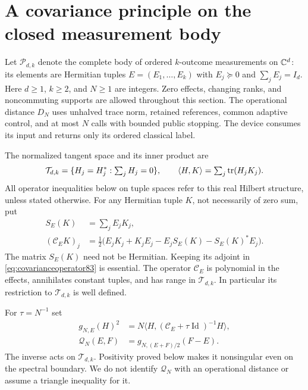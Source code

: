 \section{A covariance principle on the closed measurement body}
\label{sec:covariance83}

Let $\mathcal P_{d,k}$ denote the complete body of ordered $k$-outcome
measurements on $\mathbb C^d$: its elements are Hermitian tuples
$E=(E_1,\ldots,E_k)$ with $E_j\succeq0$ and $\sum_jE_j=I_d$.
Here $d\ge1$, $k\ge2$, and $N\ge1$ are integers.  Zero effects,
changing ranks, and noncommuting supports are allowed throughout
this section.  The operational distance $D_N$ uses unhalved trace
norm, retained references, common adaptive control, and at most $N$
calls with bounded public stopping.  The device consumes its input
and returns only its ordered classical label.

The normalized tangent space and its inner product are
\[
 \mathcal T_{d,k}=\{H_j=H_j^*: \textstyle\sum_jH_j=0\},\qquad
 \langle H,K\rangle=\sum_j\operatorname{tr}(H_jK_j).
\]
All operator inequalities below on tuple spaces refer to this real
Hilbert structure, unless stated otherwise.  For any Hermitian tuple
$K$, not necessarily of zero sum, put
\begin{align}
 S_E(K)&=\sum_jE_jK_j,\label{eq:covariances83}\\
 (\mathcal C_EK)_j
  &=\tfrac12\bigl(E_jK_j+K_jE_j-E_jS_E(K)-S_E(K)^*E_j\bigr).
                                      \label{eq:covarianceoperator83}
\end{align}
The matrix $S_E(K)$ need not be Hermitian.  Keeping its adjoint in
\eqref{eq:covarianceoperator83} is essential.  The operator
$\mathcal C_E$ is polynomial in the effects, annihilates constant
tuples, and has range in $\mathcal T_{d,k}$.  In particular its
restriction to $\mathcal T_{d,k}$ is well defined.

For $\tau=N^{-1}$ set
\begin{align}
 g_{N,E}(H)^2
  &=N\langle H,(\mathcal C_E+\tau\operatorname{Id})^{-1}H\rangle,
                                      \label{eq:covarianceform83}\\
 \mathcal Q_N(E,F)&=g_{N,(E+F)/2}(F-E).
                                      \label{eq:covariancemidpoint83}
\end{align}
The inverse acts on $\mathcal T_{d,k}$.  Positivity proved below
makes it nonsingular even on the spectral boundary.  We do not
identify $\mathcal Q_N$ with an operational distance or assume a
triangle inequality for it.

